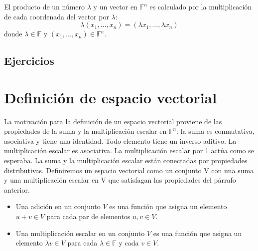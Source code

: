 \begin{tcolorbox}[colback=white]
    \begin{def.}
	El producto de un número $\lambda$ y un vector en $\mathbb{F}^n$ es calculado por la multiplicación de cada coordenada del vector por $\lambda$:
	$$\lambda(x_1,\ldots,x_n) = (\lambda x_1,\ldots, \lambda x_n)$$
	donde $\lambda \in \mathbb{F}$ y $(x_1,\ldots,x_n)\in \mathbb{F}^n$.
    \end{def.}
\end{tcolorbox}

\subsection{Ejercicios}


\section{Definición de espacio vectorial}
La motivación para la definición de un espacio vectorial proviene de las propiedades de la suma y la multiplicación escalar en $\mathbb{F}^n$: la suma es conmutativa, asociativa y tiene una identidad. Todo elemento tiene un inverso aditivo. La multiplicación escalar es asociativa. La multiplicación escalar por 1 actúa como se esperaba. La suma y la multiplicación escalar están conectadas por propiedades distributivas. Definiremos un espacio vectorial como un conjunto V con una suma y una multiplicación escalar en V que satisfagan las propiedades del párrafo anterior.

\begin{tcolorbox}[colback=white]
    \begin{def.}\hfill
	\begin{itemize}
	    \item Una adición en un conjunto $V$ es una función que asigna un elemento $u+v\in V$ para cada par de elementos $u,v\in V$.
	    \item Una multiplicación escalar en un conjunto $V$ es una función que asigna un elemento $\lambda  v\in V$ para cada $\lambda \in \mathbb{F}$ y cada $v\in V$.
	\end{itemize}
    \end{def.}
\end{tcolorbox}

